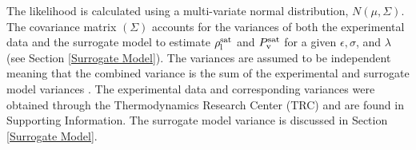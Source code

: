 \documentclass[journal=jctc,manuscript=article]{achemso}
\begin{document}
The likelihood is calculated using a multi-variate normal distribution, $N(\mu, \Sigma)$. The covariance matrix $(\Sigma)$ accounts for the variances of both the experimental data and the surrogate model to estimate $\rho_{\rm l}^{\rm sat}$ and $P_{\rm v}^{\rm sat}$ for a given $\epsilon, \sigma$, and $\lambda$ (see Section \ref{Surrogate Model}). The variances 
are assumed to be independent
meaning that the combined variance is the sum of the experimental and surrogate model variances \cite{Bay_MD}. The experimental data and corresponding variances were obtained through the Thermodynamics Research Center (TRC) and are found in Supporting Information. The surrogate model variance is discussed in Section \ref{Surrogate Model}.


\end{document}
